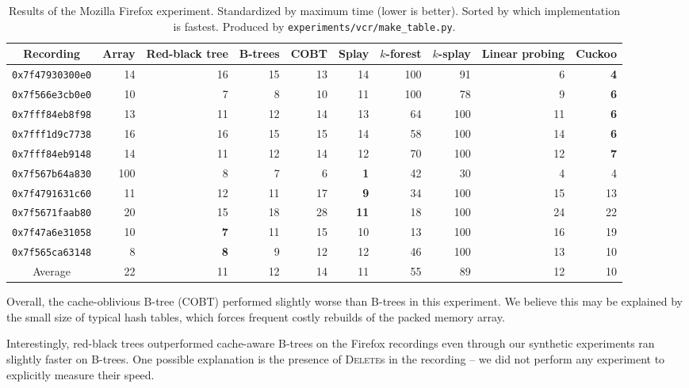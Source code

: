 \begin{table}
\centering
\begin{tabular}{|c|r|r|r|r|r|r|r|r|r|}
	\hline
	Recording &
		Array & Red-black tree &
		B-trees & COBT &
		Splay & $k$-forest & $k$-splay &
		Linear probing & Cuckoo \\

	\hline
	\texttt{0x7f47930300e0} & 14 & 16 & 15 & 13 & 14 & 100 & 91 & 6 & \textbf{4} \\
	\hline
	\texttt{0x7f566e3cb0e0} & 10 & 7 & 8 & 10 & 11 & 100 & 78 & 9 & \textbf{6} \\
	\hline
	\texttt{0x7fff84eb8f98} & 13 & 11 & 12 & 14 & 13 & 64 & 100 & 11 & \textbf{6} \\
	\hline
	\texttt{0x7fff1d9c7738} & 16 & 16 & 15 & 15 & 14 & 58 & 100 & 14 & \textbf{6} \\
	\hline
	\texttt{0x7fff84eb9148} & 14 & 11 & 12 & 14 & 12 & 70 & 100 & 12 & \textbf{7} \\
	\hline
	\texttt{0x7f567b64a830} & 100 & 8 & 7 & 6 & \textbf{1} & 42 & 30 & 4 & 4 \\
	\hline
	\texttt{0x7f4791631c60} & 11 & 12 & 11 & 17 & \textbf{9} & 34 & 100 & 15 & 13 \\
	\hline
	\texttt{0x7f5671faab80} & 20 & 15 & 18 & 28 & \textbf{11} & 18 & 100 & 24 & 22 \\
	\hline
	\texttt{0x7f47a6e31058} & 10 & \textbf{7} & 11 & 15 & 10 & 13 & 100 & 16 & 19 \\
	\hline
	\texttt{0x7f565ca63148} & 8 & \textbf{8} & 9 & 12 & 12 & 46 & 100 & 13 & 10 \\
	\hline
	\hline
	Average & 22 & 11 & 12 & 14 & 11 & 55 & 89 & 12 & 10 \\
	\hline
\end{tabular}
\caption{Results of the Mozilla Firefox experiment. Standardized by maximum
	time (lower is better). Sorted by which implementation is fastest.
	Produced by \texttt{experiments/vcr/make\_table.py}.}
\label{tab:firefox-results}
\end{table}

Overall, the cache-oblivious B-tree (COBT) performed slightly worse than
\mbox{B-trees} in this experiment. We believe this may be explained by the
small size of typical hash tables, which forces frequent costly rebuilds of
the packed memory array.

Interestingly, red-black trees outperformed cache-aware B-trees
on the Firefox recordings even through our synthetic experiments ran slightly
faster on B-trees.
One possible explanation is the presence of \textsc{Delete}s in the recording --
we did not perform any experiment to explicitly measure their speed.


